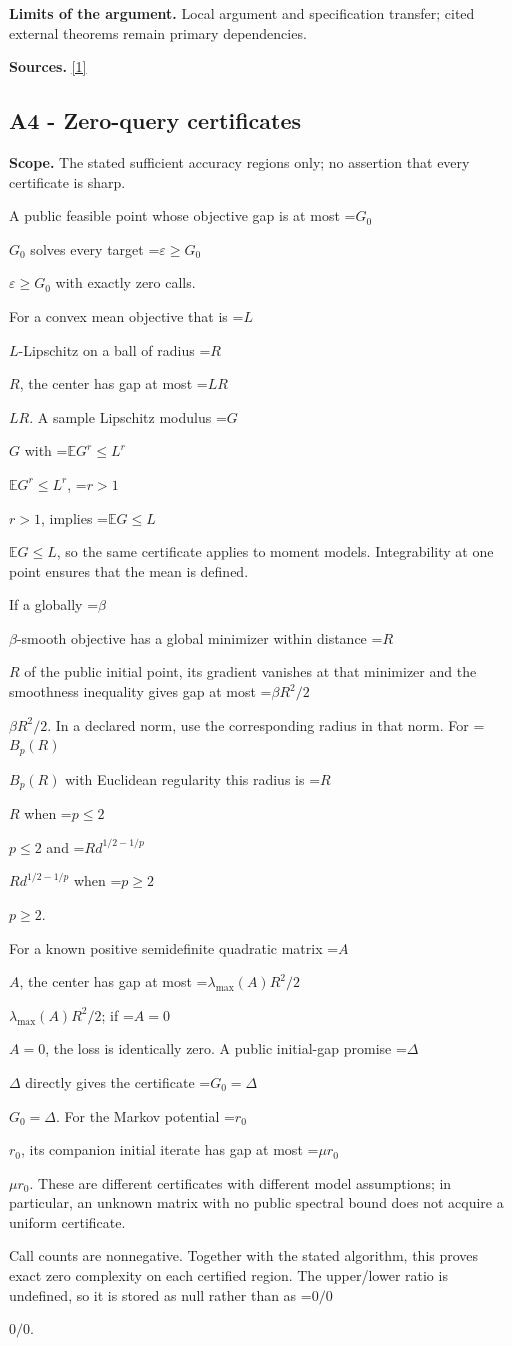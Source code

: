 \documentclass[10pt,a4paper]{article}
\newcommand{\AtlasMath}[1]{\par\begingroup\centering\setbox0=\hbox{$\displaystyle #1$}\ifdim\wd0>1.4\linewidth\typeout{ATLAS WIDE FORMULA: \the\wd0}\fi\ifdim\wd0>\linewidth\resizebox{\linewidth}{!}{\box0}\else\box0\fi\par\endgroup}
\newcommand{\AtlasInlineMath}[1]{\begingroup\setbox0=\hbox{$#1$}\ifdim\wd0>.4\linewidth\endgroup\AtlasMath{#1}\else\endgroup$#1$\fi}
\begin{document}
\textbf{Limits of the argument.} Local argument and specification transfer; cited external theorems remain primary dependencies.

\textbf{Sources.} \href{https://arxiv.org/html/2610.00345v1}{[1]}

\subsection{A4 - Zero-query certificates}
\textbf{Scope.} The stated sufficient accuracy regions only; no assertion that every certificate is sharp.

A public feasible point whose objective gap is at most \AtlasInlineMath{G_0} solves every target \AtlasInlineMath{\varepsilon\ge G_0} with exactly zero calls.

For a convex mean objective that is \AtlasInlineMath{L}-Lipschitz on a ball of radius \AtlasInlineMath{R}, the center has gap at most \AtlasInlineMath{LR}. A sample Lipschitz modulus \AtlasInlineMath{G} with \AtlasInlineMath{\mathbb E G^r\le L^r}, \AtlasInlineMath{r>1}, implies \AtlasInlineMath{\mathbb E G\le L}, so the same certificate applies to moment models. Integrability at one point ensures that the mean is defined.

If a globally \AtlasInlineMath{\beta}-smooth objective has a global minimizer within distance \AtlasInlineMath{R} of the public initial point, its gradient vanishes at that minimizer and the smoothness inequality gives gap at most \AtlasInlineMath{\beta R^2/2}. In a declared norm, use the corresponding radius in that norm. For \AtlasInlineMath{B_p(R)} with Euclidean regularity this radius is \AtlasInlineMath{R} when \AtlasInlineMath{p\le2} and \AtlasInlineMath{R d^{1/2-1/p}} when \AtlasInlineMath{p\ge2}.

For a known positive semidefinite quadratic matrix \AtlasInlineMath{A}, the center has gap at most \AtlasInlineMath{\lambda_{\max}(A)R^2/2}; if \AtlasInlineMath{A=0}, the loss is identically zero. A public initial-gap promise \AtlasInlineMath{\Delta} directly gives the certificate \AtlasInlineMath{G_0=\Delta}. For the Markov potential \AtlasInlineMath{r_0}, its companion initial iterate has gap at most \AtlasInlineMath{\mu r_0}. These are different certificates with different model assumptions; in particular, an unknown matrix with no public spectral bound does not acquire a uniform certificate.

Call counts are nonnegative. Together with the stated algorithm, this proves exact zero complexity on each certified region. The upper/lower ratio is undefined, so it is stored as null rather than as \AtlasInlineMath{0/0}.
\end{document}
